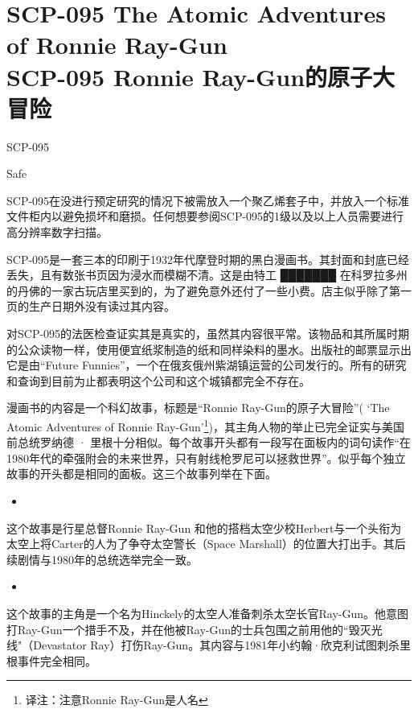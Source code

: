 \chapter[SCP-095 Ronnie Ray-Gun的原子大冒险]{
    SCP-095 The Atomic Adventures of Ronnie Ray-Gun\\
    SCP-095 Ronnie Ray-Gun的原子大冒险
}

\label{chap:SCP-095}

SCP-095

Safe

SCP-095在没进行预定研究的情况下被需放入一个聚乙烯套子中，并放入一个标准文件柜内以避免损坏和磨损。任何想要参阅SCP-095的1级以及以上人员需要进行高分辨率数字扫描。

SCP-095是一套三本的印刷于1932年代摩登时期的黑白漫画书。其封面和封底已经丢失，且有数张书页因为浸水而模糊不清。这是由特工 ███████ 在科罗拉多州的丹佛的一家古玩店里买到的，为了避免意外还付了一些小费。店主似乎除了第一页的生产日期外没有读过其内容。

对SCP-095的法医检查证实其是真实的，虽然其内容很平常。该物品和其所属时期的公众读物一样，使用便宜纸浆制造的纸和同样染料的墨水。出版社的邮票显示出它是由“Future Funnies”，一个在俄亥俄州紫湖镇运营的公司发行的。所有的研究和查询到目前为止都表明这个公司和这个城镇都完全不存在。

漫画书的内容是一个科幻故事，标题是“Ronnie Ray-Gun的原子大冒险”( ‘The Atomic Adventures of Ronnie Ray-Gun’\footnote{译注：注意Ronnie Ray-Gun是人名})，其主角人物的举止已完全证实与美国前总统罗纳德 · 里根十分相似。每个故事开头都有一段写在面板内的词句读作“在1980年代的牵强附会的未来世界，只有射线枪罗尼可以拯救世界”。似乎每个独立故事的开头都是相同的面板。这三个故事列举在下面。

\begin{itemize}
\item {}
\end{itemize}

这个故事是行星总督Ronnie Ray-Gun 和他的搭档太空少校Herbert与一个头衔为太空上将Carter的人为了争夺太空警长（Space Marshall）的位置大打出手。其后续剧情与1980年的总统选举完全一致。

\begin{itemize}
\item {}
\end{itemize}

这个故事的主角是一个名为Hinckely的太空人准备刺杀太空长官Ray-Gun。他意图打Ray-Gun一个措手不及，并在他被Ray-Gun的士兵包围之前用他的“毁灭光线"（Devastator Ray）打伤Ray-Gun。其内容与1981年小约翰·欣克利试图刺杀里根事件完全相同。

